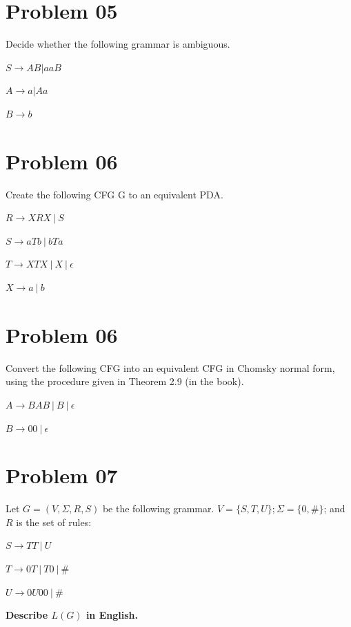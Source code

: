 \documentclass{article}
\begin{document}
\section{Problem 05}
Decide whether the following grammar is ambiguous.

\(S \rightarrow AB | aaB\)

\(A \rightarrow a | Aa\)

\(B \rightarrow b\)


\section{Problem 06}
Create the following CFG G to an equivalent PDA.

\(R \rightarrow XRX~|~S\)

\(S \rightarrow aTb~|~bTa\)

\(T \rightarrow XTX~|~X~|~\epsilon\)

\(X \rightarrow a~|~b\)

\section{Problem 06}
Convert the following CFG into an equivalent CFG in Chomsky normal form, using the procedure given in Theorem 2.9 (in the book).

\(A \rightarrow BAB ~| ~B~|~ \epsilon\)

\(B \rightarrow 00 ~|~ \epsilon\)


\section{Problem 07}
Let \(G = (V, \Sigma, R, S)\) be the following grammar. \(V = \{S, T, U \}; \Sigma = \{0, \#\}\); and $R$ is the set of rules:

\(S \rightarrow TT~|~U\)

\(T \rightarrow 0T~|~T0~|~\#\)

\(U \rightarrow 0U00~|~\#\)

\textbf{Describe \(L(G) \) in English.}
\end{document}

